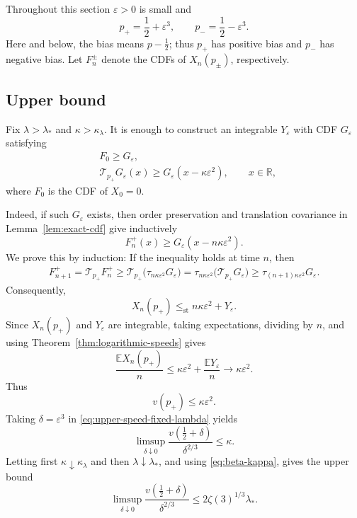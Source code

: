 \documentclass[12pt,preprint]{amsart}
\numberwithin{equation}{section}
\theoremstyle{plain}
\theoremstyle{definition}
\newcommand{\E}{\mathbb E}
\newcommand{\stle}{\le_{\mathrm{st}}}
\begin{document}
Throughout this section $\varepsilon>0$ is small and
\[
 p_+=\frac12+\varepsilon^3,
 \qquad
 p_-=\frac12-\varepsilon^3.
\]
Here and below, the bias means $p-\frac{1}{2}$; thus $p_+$ has positive
bias and $p_-$ has negative bias.  Let $F_n^\pm$ denote the CDFs of
$X_n(p_\pm)$, respectively.

\subsection{Upper bound}

Fix $\lambda>\lambda_*$ and $\kappa>\kappa_{\lambda}$.  It is enough to construct an
integrable $Y_\varepsilon$ with CDF $G_\varepsilon$ satisfying
\begin{align}
 &F_0\ge G_\varepsilon, \label{upp_barrier_init}\\
 &\mathcal T_{p_+}G_\varepsilon(x)
 \ge G_\varepsilon(x-\kappa\varepsilon^2),
 \qquad x\in\mathbb R,\label{upp_barrier_ineq}
\end{align}
where $F_0$ is the CDF of $X_0=0$.

Indeed, if such $G_\varepsilon$ exists, then order preservation and
translation covariance in Lemma~\ref{lem:exact-cdf} give inductively
\[
 F_n^+(x)\ge G_\varepsilon(x-n\kappa\varepsilon^2).
\]
We prove this by induction: If the inequality holds at time $n$, then
\[
\begin{aligned}
 F_{n+1}^+
 =\mathcal T_{p_+}F_n^+
 \ge \mathcal T_{p_+}
     \bigl(\tau_{n\kappa\varepsilon^2}G_\varepsilon\bigr)
 =\tau_{n\kappa\varepsilon^2}
     \bigl(\mathcal T_{p_+}G_\varepsilon\bigr)
 \ge\tau_{(n+1)\kappa\varepsilon^2}G_\varepsilon.
\end{aligned}
\]
Consequently,
\[
 X_n(p_+)\stle n\kappa\varepsilon^2+Y_\varepsilon.
\]
Since $X_n(p_+)$ and $Y_\varepsilon$ are integrable, taking expectations,
dividing by $n$, and using Theorem~\ref{thm:logarithmic-speeds} gives
\[
 \frac{\E X_n(p_+)}n
 \le \kappa\varepsilon^2+\frac{\E Y_\varepsilon}n
 \longrightarrow \kappa\varepsilon^2.
\]
Thus
\begin{equation}
 v(p_+)\le\kappa\varepsilon^2.
 \label{eq:upper-speed-fixed-lambda}
\end{equation}
Taking $\delta=\varepsilon^3$ in
\eqref{eq:upper-speed-fixed-lambda} yields
\[
 \limsup_{\delta\downarrow0}
 \frac{v(\frac12+\delta)}{\delta^{2/3}}
 \le\kappa.
\]
Letting first $\kappa\downarrow\kappa_{\lambda}$ and then
$\lambda\downarrow\lambda_*$, and using \eqref{eq:beta-kappa}, gives the upper bound
\begin{equation}
 \limsup_{\delta\downarrow0}
 \frac{v(\frac12+\delta)}{\delta^{2/3}}
 \le2\zeta(3)^{1/3}\lambda_*.
 \label{eq:sharp-upper-bound}
\end{equation}
\end{document}
